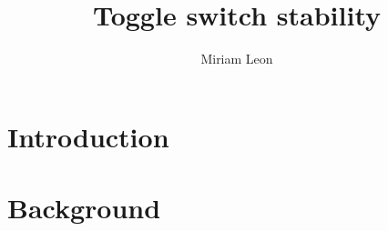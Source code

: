 \documentclass[]{../chapter_only}
\title{Toggle switch stability}
\author{Miriam Leon}
\begin{document}

\tableofcontents*
{}



\mainmatter*
\chapter{Introduction}



\chapter{Background}




\printbibliography
\end{document}
